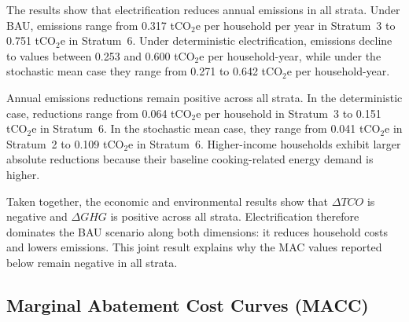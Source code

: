\documentclass[authoryear,preprint,review,10pt]{elsarticle}
\begin{document}
\begin{table}[H]
\centering
\caption{Annual household GHG emissions under BAU and electrification scenarios by socioeconomic stratum in Bogotá}
\label{tab:ghg_results}

\end{table}

The results show that electrification reduces annual emissions in all strata. Under BAU, emissions range from 0.317 tCO$_2$e per household per year in Stratum~3 to 0.751 tCO$_2$e in Stratum~6. Under deterministic electrification, emissions decline to values between 0.253 and 0.600 tCO$_2$e per household-year, while under the stochastic mean case they range from 0.271 to 0.642 tCO$_2$e per household-year.

Annual emissions reductions remain positive across all strata. In the deterministic case, reductions range from 0.064 tCO$_2$e per household in Stratum~3 to 0.151 tCO$_2$e in Stratum~6. In the stochastic mean case, they range from 0.041 tCO$_2$e in Stratum~2 to 0.109 tCO$_2$e in Stratum~6. Higher-income households exhibit larger absolute reductions because their baseline cooking-related energy demand is higher.

Taken together, the economic and environmental results show that $\Delta TCO$ is negative and $\Delta GHG$ is positive across all strata. Electrification therefore dominates the BAU scenario along both dimensions: it reduces household costs and lowers emissions. This joint result explains why the MAC values reported below remain negative in all strata.

\subsection{Marginal Abatement Cost Curves (MACC)}
\label{results:macc}
\end{document}
